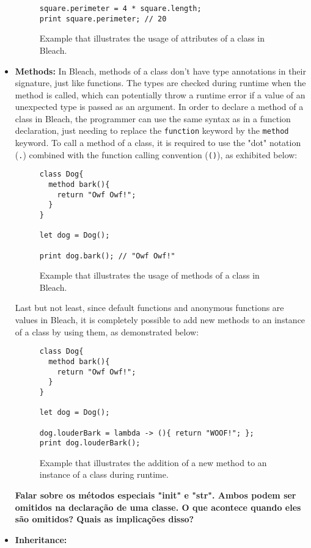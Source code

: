 \begin{itemize}
\begin{figure}[H]
\begin{lstlisting}
square.perimeter = 4 * square.length;
print square.perimeter; // 20
    \end{lstlisting}
    \caption{Example that illustrates the usage of attributes of a class in Bleach.}
\end{figure}

    \item \textbf{Methods:} In Bleach, methods of a class don't have type annotations in their signature, just like functions. The types are checked during runtime when the method is called, which can potentially throw a runtime error if a value of an unexpected type is passed as an argument. In order to declare a method of a class in Bleach, the programmer can use the same syntax as in a function declaration, just needing to replace the \texttt{function} keyword by the \texttt{method} keyword. To call a method of a class, it is required to use the "dot" notation (\texttt{.}) combined with the function calling convention (\texttt{()}), as exhibited below:
\begin{figure}[H]
    \centering
    \begin{lstlisting}
class Dog{
  method bark(){
    return "Owf Owf!";
  }
}

let dog = Dog();

print dog.bark(); // "Owf Owf!"
    \end{lstlisting}
    \caption{Example that illustrates the usage of methods of a class in Bleach.}
\end{figure}

    Last but not least, since default functions and anonymous functions are values in Bleach, it is completely possible to add new methods to an instance of a class by using them, as demonstrated below:
\begin{figure}[H]
    \centering
    \begin{lstlisting}
class Dog{
  method bark(){
    return "Owf Owf!";
  }
}

let dog = Dog();

dog.louderBark = lambda -> (){ return "WOOF!"; };
print dog.louderBark();
    \end{lstlisting}
    \caption{Example that illustrates the addition of a new method to an instance of a class during runtime.}
\end{figure}
    
    \textbf{Falar sobre os métodos especiais "init" e "str". Ambos podem ser omitidos na declaração de uma classe. O que acontece quando eles são omitidos? Quais as implicações disso?}
    \item \textbf{Inheritance:}
\end{itemize}


